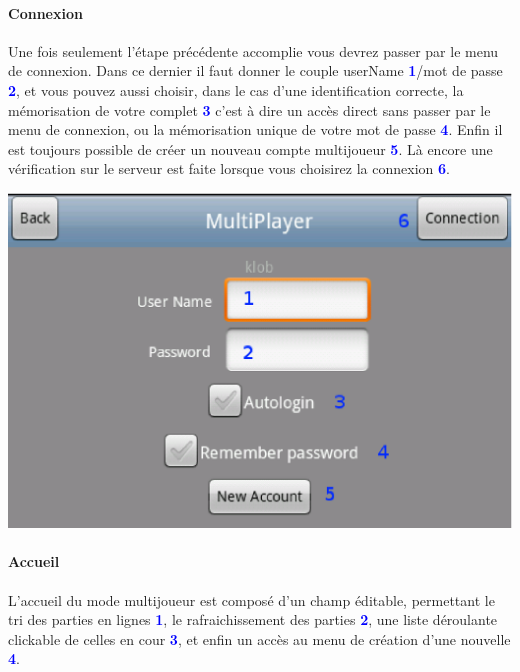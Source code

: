 	\paragraph{Connexion}
		Une fois seulement l'étape précédente accomplie vous devrez passer par le menu
		de connexion. Dans ce dernier il faut donner le couple
		userName \textcolor{blue}{\textbf{1}}/mot de passe
		\textcolor{blue}{\textbf{2}}, et vous pouvez aussi choisir, dans le cas d'une
		identification correcte, la mémorisation de votre complet
		\textcolor{blue}{\textbf{3}} c'est à dire un accès direct sans passer par le
		menu de connexion, ou la mémorisation unique de votre mot de passe
		\textcolor{blue}{\textbf{4}}. Enfin il est toujours possible de créer un
		nouveau compte multijoueur \textcolor{blue}{\textbf{5}}. Là encore une
		vérification sur le serveur est faite lorsque vous choisirez la connexion
		\textcolor{blue}{\textbf{6}}.
		
		\begin{center}
			\includegraphics[scale=0.7]{Manuel/Img/17.eps}
		\end{center}
	
	\paragraph{Accueil}
	L'accueil du mode multijoueur est composé d'un champ éditable, permettant le
	tri des parties en lignes \textcolor{blue}{\textbf{1}}, le rafraichissement des
	parties \textcolor{blue}{\textbf{2}}, une liste déroulante clickable de celles
	en cour \textcolor{blue}{\textbf{3}}, et enfin un accès au menu de création
	d'une nouvelle \textcolor{blue}{\textbf{4}}.
	
